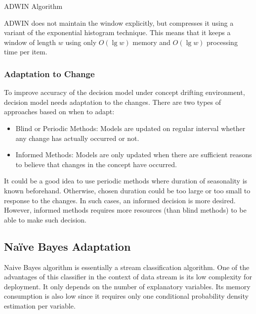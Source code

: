 \begin{algorithm}[htbp]
    \DontPrintSemicolon
\label{alg:adwin}
\caption{ADWIN Algorithm}

\end{algorithm}

ADWIN does not maintain the window explicitly, but compresses it using a variant of the exponential histogram technique. This means that it keeps a window of length $w$ using only $O(\lg w)$ memory and $O(\lg w)$ processing time per item.

\subsubsection{Adaptation to Change}
To improve accuracy of the decision model under concept drifting environment, decision model needs adaptation to the changes. There are two types of approaches based on when to adapt: 
\begin{itemize}    
    \item Blind or Periodic Methods: Models are updated on regular interval whether any change has actually occurred or not. 
    \item Informed Methods: Models are only updated when there are sufficient reasons to believe that changes in the concept have occurred.
\end{itemize}
It could be a good idea to use periodic methods where duration of seasonality is known beforehand. Otherwise, chosen duration could be too large or too small to response to the changes. In such cases, an informed decision is more desired. However, informed methods requires more resources (than blind methods) to be able to make such decision.

\subsection{Na\"ive Bayes Adaptation}
Naive Bayes algorithm is essentially a stream classification algorithm. One of the advantages of this classifier in the context of data stream is its low complexity for deployment. It only depends on the number of explanatory variables. Its memory consumption is also low since it requires only one conditional probability density estimation per variable.

